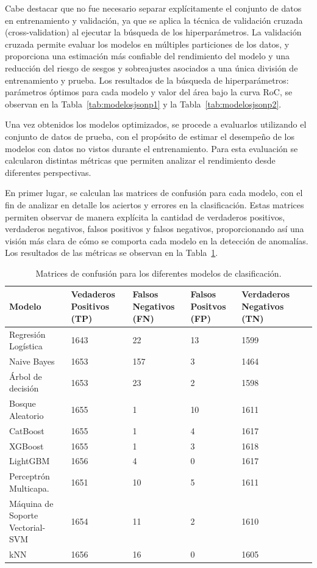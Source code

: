 \documentclass[11pt,a4paper,spanish]{book}
\numberwithin{equation}{chapter}
\numberwithin{figure}{chapter}
\begin{document}
Cabe destacar que no fue necesario separar explícitamente el conjunto de datos en 
entrenamiento y validación, ya que se aplica la técnica de validación cruzada 
(cross-validation) al ejecutar la búsqueda de los hiperparámetros. La validación 
cruzada permite evaluar los modelos en múltiples particiones de los datos, y 
proporciona una estimación más confiable del rendimiento del modelo y una reducción 
del riesgo de sesgos y sobreajustes asociados a una única división de entrenamiento y 
prueba. Los resultados de la búsqueda de hiperparámetros: parámetros óptimos para cada 
modelo y valor del área bajo la curva RoC, se observan en la 
Tabla~\ref{tab:modelosjsonp1}  y la Tabla~\ref{tab:modelosjsonp2}.  



Una vez obtenidos los modelos optimizados, se procede a evaluarlos utilizando el conjunto 
de datos de prueba, con el propósito de estimar el desempeño de los modelos con datos 
no vistos durante el entrenamiento. Para esta evaluación se calcularon distintas 
métricas que permiten analizar el rendimiento desde diferentes perspectivas. 


En primer lugar, se calculan las matrices de confusión para cada modelo, 
con el fin de analizar en detalle los aciertos y errores en la clasificación. 
Estas matrices permiten observar de manera explícita la cantidad de verdaderos positivos, 
verdaderos negativos, falsos positivos y falsos negativos, 
proporcionando así una visión más clara de cómo se comporta cada modelo en la detección 
de anomalías. Los resultados de las métricas se observan en  la Tabla~\ref{tab:matrixconff}. 


\begin{table}[H]
\caption{Matrices de confusión para los diferentes modelos de clasificación.}
\centering
\renewcommand{\arraystretch}{1.2}
\footnotesize
\begin{tabularx}{\textwidth}{|l|X|X|X|X|X|}
    \hline
    \textbf{Modelo} & 
    \textbf{Vedaderos Positivos (TP)} & 
    \textbf{Falsos Negativos (FN)} & 
    \textbf{Falsos Positvos (FP)} & 
    \textbf{Verdaderos Negativos (TN)} \\
    \hline
    Regresión Logística & 1643 & 22 & 13 & 1599 \\
    \hline
    Naive Bayes & 1653 & 157 & 3 & 1464 \\
    \hline
    Árbol de decisión & 1653 & 23 & 2 & 1598 \\
    \hline
    Bosque Aleatorio & 1655 & 1 & 10 & 1611 \\
    \hline
    CatBoost & 1655 & 1 & 4 & 1617 \\
    \hline
    XGBoost & 1655 & 1 & 3 & 1618 \\
    \hline
     LightGBM & 1656 & 4 & 0 & 1617 \\
    \hline
    Perceptrón Multicapa. & 1651 & 10 & 5 & 1611 \\
    \hline
    Máquina de Soporte Vectorial-SVM & 1654 & 11 & 2 & 1610 \\
    \hline
    kNN & 1656 & 16 & 0 & 1605 \\
    \hline
\end{tabularx}
\label{tab:matrixconff}
\end{table}
\end{document}
